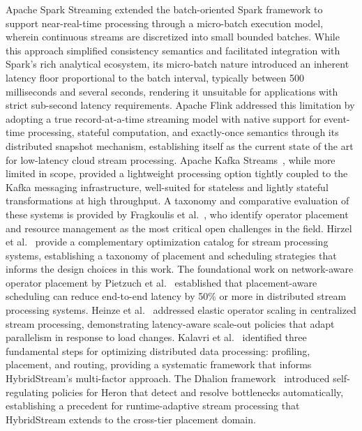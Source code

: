 \documentclass[preprint,review,12pt]{elsarticle}
\begin{document}
Apache Spark Streaming \cite{zaharia2013spark} extended the batch-oriented Spark framework to support near-real-time processing through a micro-batch execution model, wherein continuous streams are discretized into small bounded batches. While this approach simplified consistency semantics and facilitated integration with Spark's rich analytical ecosystem, its micro-batch nature introduced an inherent latency floor proportional to the batch interval, typically between 500 milliseconds and several seconds, rendering it unsuitable for applications with strict sub-second latency requirements. Apache Flink \cite{carbone2015flink} addressed this limitation by adopting a true record-at-a-time streaming model with native support for event-time processing, stateful computation, and exactly-once semantics through its distributed snapshot mechanism, establishing itself as the current state of the art for low-latency cloud stream processing. Apache Kafka Streams~\cite{kreps2011kafka}, while more limited in scope, provided a lightweight processing option tightly coupled to the Kafka messaging infrastructure, well-suited for stateless and lightly stateful transformations at high throughput. A taxonomy and comparative evaluation of these systems is provided by Fragkoulis et al.~\cite{fragkoulis2023survey}, who identify operator placement and resource management as the most critical open challenges in the field. Hirzel et al.~\cite{hirzel2014catalog} provide a complementary optimization catalog for stream processing systems, establishing a taxonomy of placement and scheduling strategies that informs the design choices in this work. The foundational work on network-aware operator placement by Pietzuch et al.~\cite{pietzuch2006sbon} established that placement-aware scheduling can reduce end-to-end latency by 50\% or more in distributed stream processing systems. Heinze et al.~\cite{heinze2014elastic} addressed elastic operator scaling in centralized stream processing, demonstrating latency-aware scale-out policies that adapt parallelism in response to load changes. Kalavri et al.~\cite{kalavri2018three} identified three fundamental steps for optimizing distributed data processing: profiling, placement, and routing, providing a systematic framework that informs HybridStream's multi-factor approach. The Dhalion framework~\cite{floratou2017dhalion} introduced self-regulating policies for Heron that detect and resolve bottlenecks automatically, establishing a precedent for runtime-adaptive stream processing that HybridStream extends to the cross-tier placement domain.
\end{document}
